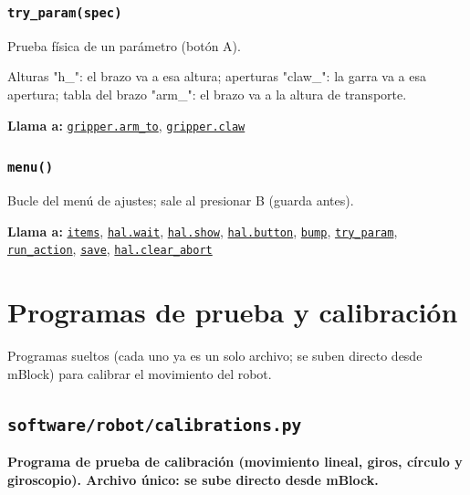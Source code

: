 \subsubsection{\texttt{try\_\allowbreak{}param(spec)}}\label{fn:settings:try-param}
\noindent Prueba física de un parámetro (botón A).

Alturas "h\_": el brazo va a esa altura; aperturas "claw\_": la garra va a esa apertura; tabla del brazo "arm\_": el brazo va a la altura de transporte.

\par{}\par\smallskip
\noindent\textbf{Llama a:} \hyperref[fn:gripper:arm-to]{\texttt{gripper.arm\_\allowbreak{}to}}, \hyperref[fn:gripper:claw]{\texttt{gripper.claw}}\par

\subsubsection{\texttt{menu()}}\label{fn:settings:menu}
\noindent Bucle del menú de ajustes; sale al presionar B (guarda antes).

\noindent\textbf{Llama a:} \hyperref[fn:settings:items]{\texttt{items}}, \hyperref[fn:hal:wait]{\texttt{hal.wait}}, \hyperref[fn:hal:show]{\texttt{hal.show}}, \hyperref[fn:hal:button]{\texttt{hal.button}}, \hyperref[fn:settings:bump]{\texttt{bump}}, \hyperref[fn:settings:try-param]{\texttt{try\_\allowbreak{}param}}, \hyperref[fn:settings:run-action]{\texttt{run\_\allowbreak{}action}}, \hyperref[fn:settings:save]{\texttt{save}}, \hyperref[fn:hal:clear-abort]{\texttt{hal.clear\_\allowbreak{}abort}}\par

\section{Programas de prueba y calibraci\'on}
Programas sueltos (cada uno ya es un solo archivo; se suben directo desde mBlock) para calibrar el movimiento del robot.
\subsection{\texttt{software/robot/calibrations.py}}\label{mod:calibrations}
\textbf{Programa de prueba de calibración (movimiento lineal, giros, círculo y giroscopio). Archivo único: se sube directo desde mBlock.}

